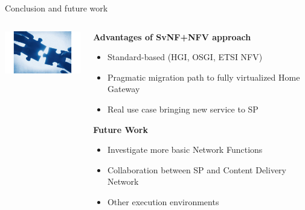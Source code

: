 \documentclass[a4paper]{beamer}
\begin{document}
\begin{frame}{Conclusion and future work}
	\begin{columns}[T]
		\begin{column}[T]{0.33 \textwidth} 
			\vspace{5em}
			\includegraphics[width=10em]{conclusion.jpg}
		\end{column}
										
		\begin{column}[T]{0.66\textwidth} 
										   
			\textbf{Advantages of SvNF+NFV approach}
			\begin{itemize}
				\item Standard-based (HGI, OSGI, ETSI NFV)
				\item Pragmatic migration path to fully virtualized Home Gateway
				\item Real use case bringing new service to SP
			\end{itemize}
			\vspace{3mm}
			\textbf{Future Work}
			\begin{itemize}
				\item Investigate more basic Network Functions
				\item Collaboration between SP and Content Delivery Network
				\item Other execution environments
			\end{itemize}
																																						
		\end{column}
																										
	\end{columns}
	

	
\end{frame}
\end{document}
